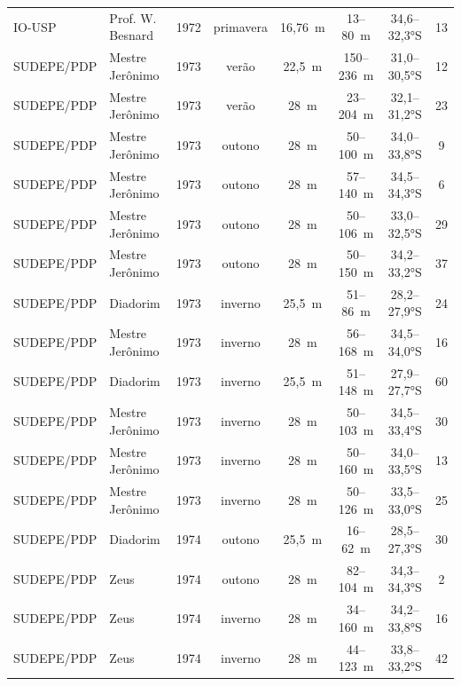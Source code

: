 \documentclass[a4paper,11pt,twoside,showtrims,onecolumn,openright,final]{memoir}
\begin{document}
\begin{table}
\begin{tiny}
\begin{tabular*}{\textwidth}{l@{\extracolsep{\fill}}lcccccc}
 IO-USP		&	Prof. W. Besnard & 1972 &         primavera &   16,76~m &      13--80~m &   34,6--32,3°S &          13 		\\
 SUDEPE/PDP	&	Mestre Jerônimo  & 1973 &         verão &    22,5~m &     150--236~m &   31,0--30,5°S &          12 	\\
 SUDEPE/PDP	&	Mestre Jerônimo  & 1973 &         verão &      28~m &      23--204~m &   32,1--31,2°S &          23 	\\
 SUDEPE/PDP	&	Mestre Jerônimo  & 1973 &         outono &      28~m &      50--100~m &   34,0--33,8°S &           9 	\\
 SUDEPE/PDP	&	Mestre Jerônimo  & 1973 &         outono &      28~m &      57--140~m &   34,5--34,3°S &           6 	\\
 SUDEPE/PDP	&	Mestre Jerônimo  & 1973 &         outono &      28~m &      50--106~m &   33,0--32,5°S &          29 	\\
 SUDEPE/PDP	&	Mestre Jerônimo  & 1973 &         outono &      28~m &      50--150~m &   34,2--33,2°S &          37 	\\
 SUDEPE/PDP	&	Diadorim         & 1973 &         inverno &    25,5~m &      51--86~m &   28,2--27,9°S &          24 	\\
 SUDEPE/PDP	&	Mestre Jerônimo  & 1973 &         inverno &      28~m &      56--168~m &   34,5--34,0°S &          16 	\\
 SUDEPE/PDP	&	Diadorim         & 1973 &         inverno &    25,5~m &      51--148~m &   27,9--27,7°S &          60 	\\
 SUDEPE/PDP	&	Mestre Jerônimo  & 1973 &         inverno &      28~m &      50--103~m &   34,5--33,4°S &          30 	\\
 SUDEPE/PDP	&	Mestre Jerônimo  & 1973 &         inverno &      28~m &      50--160~m &   34,0--33,5°S &          13 	\\
 SUDEPE/PDP	&	Mestre Jerônimo  & 1973 &         inverno &      28~m &      50--126~m &   33,5--33,0°S &          25 	\\
 SUDEPE/PDP	&	Diadorim         & 1974 &         outono &    25,5~m &      16--62~m &   28,5--27,3°S &          30 	\\
 SUDEPE/PDP	&	Zeus             & 1974 &         outono &      28~m &      82--104~m &   34,3--34,3°S &           2 	\\
 SUDEPE/PDP	&	Zeus             & 1974 &         inverno &      28~m &      34--160~m &   34,2--33,8°S &          16 	\\
 SUDEPE/PDP	&	Zeus             & 1974 &         inverno &      28~m &      44--123~m &   33,8--33,2°S &          42 	\\

\end{tabular*}
\end{tiny}
\end{table}
\end{document}
